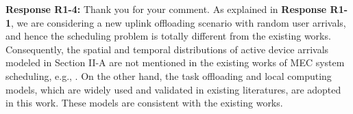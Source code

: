 \documentclass[12pt,onecolumn]{IEEEtran}
\newcommand{\blue}{\color{blue}}
\newcommand{\spaceblank}{\vskip 4mm}
\begin{document}



\spaceblank
{}
\spaceblank
{\blue \textbf{Response R1-4:} Thank you for your comment. As explained in \textbf{Response R1-1}, we are considering a new uplink offloading scenario with random user arrivals, and hence the scheduling problem is totally different from the existing works. Consequently, the spatial and temporal distributions of active device arrivals modeled in Section II-A are not mentioned in the existing works of MEC system scheduling, e.g., \cite{You2015SingleUserWPT,you2016singleuser,huang2012dynamic,liu2016delayopt,you2016multiuser,chen2015decentalizedgame,chen2016gametheorymec,mao2016power-delay,Ko2018HetnetMEC}. On the other hand, the task offloading and local computing models, which are widely used and validated in existing literatures, are adopted in this work. These models are consistent with the existing works.
}
\end{document}

